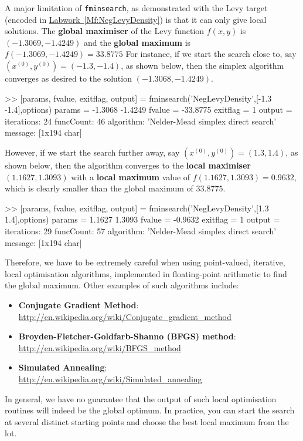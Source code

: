 A major limitation of {\tt fminsearch}, as demonstrated with the Levy target (encoded in \hyperref[Mf:NegLevyDensity]{Labwork~\ref*{Mf:NegLevyDensity}}) is that it  can only give local solutions.  The {\bf global maximiser} of the Levy function $f(x,y)$ is $(-1.3069, -1.4249)$ and the {\bf global maximum} is $f (-1.3069, -1.4249)=33.8775$ For instance, if we start the search close to, say $(x^{(0)},y^{(0)})=(-1.3,-1.4)$, as shown below, then the simplex algorithm converges as desired to the solution $(-1.3068, -1.4249)$.
\begin{VrbM}
>> [params, fvalue, exitflag, output] = fminsearch('NegLevyDensity',[-1.3 -1.4],options)
params =   -1.3068   -1.4249
fvalue =  -33.8775
exitflag =     1
output = 
    iterations: 24
     funcCount: 46
     algorithm: 'Nelder-Mead simplex direct search'
       message: [1x194 char]
\end{VrbM}
However, if we start the search further away, say $(x^{(0)},y^{(0)})=(1.3,1.4)$, as shown below, then the algorithm converges to the {\bf local maximiser} $(1.1627,1.3093)$ with a {\bf local maximum} value of $f(1.1627,1.3093)=0.9632$, which is clearly smaller than the global maximum of $33.8775$.  
\begin{VrbM}
>> [params, fvalue, exitflag, output] = fminsearch('NegLevyDensity',[1.3 1.4],options)
params = 1.1627    1.3093
fvalue = -0.9632
exitflag = 1
output = 
   iterations: 29
     funcCount: 57
     algorithm: 'Nelder-Mead simplex direct search'
       message: [1x194 char]
\end{VrbM}
Therefore, we have to be extremely careful when using point-valued, iterative,  local optimisation algorithms, implemented in floating-point arithmetic to find the global maximum.  Other examples of such algorithms include:
\begin{itemize}
\item {\bf Conjugate Gradient Method}:\\ \href{http://en.wikipedia.org/wiki/Conjugate_gradient_method}{\url{http://en.wikipedia.org/wiki/Conjugate_gradient_method}}
\item {\bf Broyden-Fletcher-Goldfarb-Shanno (BFGS) method}:\\ \href{http://en.wikipedia.org/wiki/BFGS_method}{\url{http://en.wikipedia.org/wiki/BFGS_method}}
\item {\bf Simulated Annealing}:\\ \href{http://en.wikipedia.org/wiki/Simulated_annealing}{\url{http://en.wikipedia.org/wiki/Simulated_annealing}}
\end{itemize}
In general, we have no guarantee that the output of such local optimisation routines will indeed be the global optimum.  In practice, you can start the search at several distinct starting points and choose the best local maximum from the lot.

